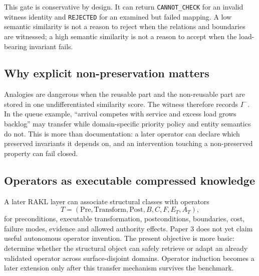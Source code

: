 This gate is conservative by design. It can return \texttt{CANNOT\_CHECK} for an invalid witness identity and \texttt{REJECTED} for an examined but failed mapping. A low semantic similarity is not a reason to reject when the relations and boundaries are witnessed; a high semantic similarity is not a reason to accept when the load-bearing invariant fails.

\subsection{Why explicit non-preservation matters}

Analogies are dangerous when the reusable part and the non-reusable part are stored in one undifferentiated similarity score. The witness therefore records $I^-$. In the queue example, ``arrival competes with service and excess load grows backlog'' may transfer while domain-specific priority policy and entity semantics do not. This is more than documentation: a later operator can declare which preserved invariants it depends on, and an intervention touching a non-preserved property can fail closed.

\subsection{Operators as executable compressed knowledge}

A later RAKL layer can associate structural classes with operators
\[
T=(\mathrm{Pre},\mathrm{Transform},\mathrm{Post},B,C,F,E_T,A_T),
\]
for preconditions, executable transformation, postconditions, boundaries, cost, failure modes, evidence and allowed authority effects. Paper 3 does not yet claim useful autonomous operator invention. The present objective is more basic: determine whether the structural object can safely retrieve or adapt an already validated operator across surface-disjoint domains. Operator induction becomes a later extension only after this transfer mechanism survives the benchmark.
